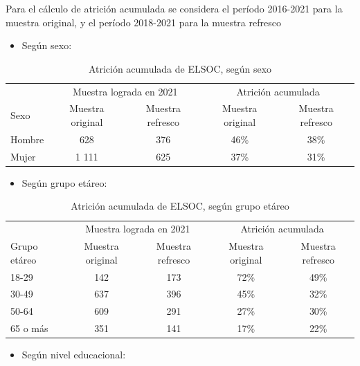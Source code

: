 \documentclass[
  12pt,
]{book}
\providecommand{\tightlist}{%
  \setlength{\itemsep}{0pt}\setlength{\parskip}{0pt}}
\begin{document}
Para el cálculo de atrición acumulada se considera el período 2016-2021 para la muestra original, y el período 2018-2021 para la muestra refresco

\begin{itemize}
\tightlist
\item
  Según sexo:
\end{itemize}

\begin{table}

\caption{\label{tab:tabla-atricion-sexo}Atrición acumulada de ELSOC, según sexo}
\centering
\begin{tabular}[t]{l|c|c|c|c}
\hline
\multicolumn{1}{c|}{ } & \multicolumn{2}{c|}{Muestra lograda en 2021} & \multicolumn{2}{c}{Atrición acumulada} \\
\cline{2-3} \cline{4-5}
Sexo & Muestra original & Muestra refresco & Muestra original & Muestra refresco\\
\hline
Hombre & 628 & 376 & 46\% & 38\%\\
\hline
Mujer & 1 111 & 625 & 37\% & 31\%\\
\hline
\end{tabular}
\end{table}

\begin{itemize}
\tightlist
\item
  Según grupo etáreo:
\end{itemize}

\begin{table}

\caption{\label{tab:tabla-atricion-edad}Atrición acumulada de ELSOC, según grupo etáreo}
\centering
\begin{tabular}[t]{l|c|c|c|c}
\hline
\multicolumn{1}{c|}{ } & \multicolumn{2}{c|}{Muestra lograda en 2021} & \multicolumn{2}{c}{Atrición acumulada} \\
\cline{2-3} \cline{4-5}
Grupo etáreo & Muestra original & Muestra refresco & Muestra original & Muestra refresco\\
\hline
18-29 & 142 & 173 & 72\% & 49\%\\
\hline
30-49 & 637 & 396 & 45\% & 32\%\\
\hline
50-64 & 609 & 291 & 27\% & 30\%\\
\hline
65 o más & 351 & 141 & 17\% & 22\%\\
\hline
\end{tabular}
\end{table}

\begin{itemize}
\tightlist
\item
  Según nivel educacional:
\end{itemize}
\end{document}
